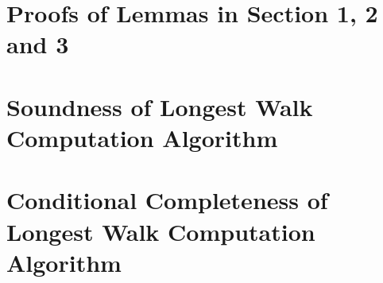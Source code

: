 
\section{Proofs of Lemmas in Section 1, 2 and 3}
\label{apdx:lemma_sec123}

% 
% 
% 
% 
% 
% 
\section{Soundness of Longest Walk Computation Algorithm}
\label{apdx:longestwalkalg_soundness}

\section{Conditional Completeness of Longest Walk Computation Algorithm}
\label{apdx:longestwalkalg_completeness}


